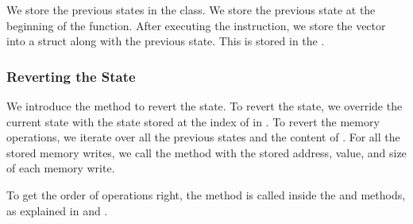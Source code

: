 We store the previous states in the  class. We store the previous state at the beginning of the  function. After executing the instruction, we store the  vector into a  struct along with the previous state. This is stored in the  .

\subsubsection{Reverting the State}

We introduce the  method to revert the state.
To revert the state, we override the current state with the state stored at the index of  in . To revert the memory operations, we iterate over all the previous states and the content of . For all the stored memory writes, we call the  method with the stored address, value, and size of each memory write.

To get the order of operations right, the  method is called inside the  and  methods, as explained in  and .


%
%






